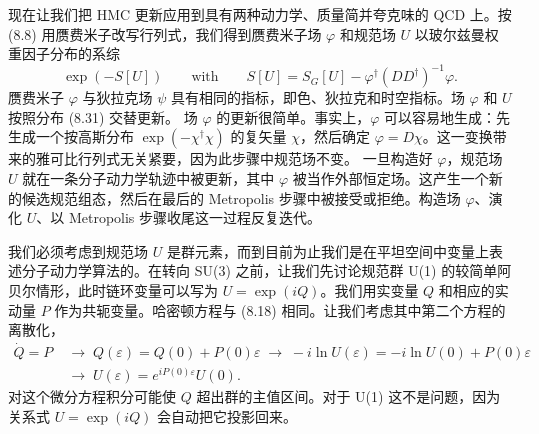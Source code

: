 现在让我们把 HMC 更新应用到具有两种动力学、质量简并夸克味的 QCD 上。按 (8.8) 用赝费米子改写行列式，我们得到赝费米子场 $\varphi$ 和规范场 $U$ 以玻尔兹曼权重因子分布的系综
\begin{equation}
\exp(-S[U]) \qquad \text{with} \qquad S[U] = S_G[U] - \varphi^\dagger(DD^\dagger)^{-1}\varphi.
\end{equation}
赝费米子 $\varphi$ 与狄拉克场 $\psi$ 具有相同的指标，即色、狄拉克和时空指标。场 $\varphi$ 和 $U$ 按照分布 (8.31) 交替更新。
场 $\varphi$ 的更新很简单。事实上，$\varphi$ 可以容易地生成：先生成一个按高斯分布 $\exp(-\chi^\dagger\chi)$ 的复矢量 $\chi$，然后确定 $\varphi = D\chi$。这一变换带来的雅可比行列式无关紧要，因为此步骤中规范场不变。
一旦构造好 $\varphi$，规范场 $U$ 就在一条分子动力学轨迹中被更新，其中 $\varphi$ 被当作外部恒定场。这产生一个新的候选规范组态，然后在最后的 Metropolis 步骤中被接受或拒绝。构造场 $\varphi$、演化 $U$、以 Metropolis 步骤收尾这一过程反复迭代。

我们必须考虑到规范场 $U$ 是群元素，而到目前为止我们是在平坦空间中变量上表述分子动力学算法的。在转向 SU(3) 之前，让我们先讨论规范群 U(1) 的较简单阿贝尔情形，此时链环变量可以写为 $U = \exp(iQ)$。我们用实变量 $Q$ 和相应的实动量 $P$ 作为共轭变量。哈密顿方程与 (8.18) 相同。让我们考虑其中第二个方程的离散化，
\begin{equation}
\begin{aligned}
\dot{Q} = P \;&\to\; Q(\varepsilon) = Q(0) + P(0)\varepsilon
\;\to\; -i\ln U(\varepsilon) = -i\ln U(0) + P(0)\varepsilon\\
&\to\; U(\varepsilon) = e^{iP(0)\varepsilon}U(0).
\end{aligned}
\end{equation}
对这个微分方程积分可能使 $Q$ 超出群的主值区间。对于 U(1) 这不是问题，因为关系式 $U = \exp(iQ)$ 会自动把它投影回来。

